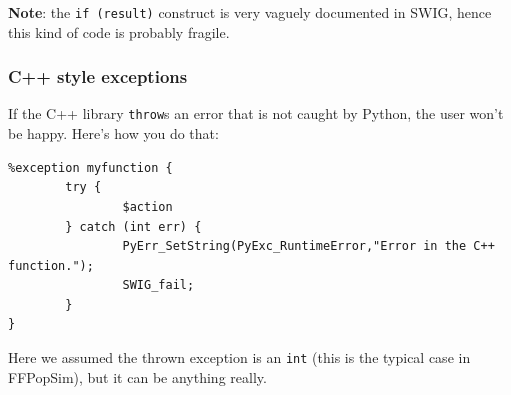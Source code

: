 \documentclass[12pt,a4paper,notitlepage,onecolumn]{article}
\begin{document}
\noindent\textbf{Note}: the \texttt{if (result)} construct is very vaguely documented in
SWIG, hence this kind of code is probably fragile.

\subsubsection*{C++ style exceptions}
If the C++ library \texttt{throw}s an error that is not caught by Python, the
user won't be happy. Here's how you do that:
\begin{verbatim}
%exception myfunction {
        try {
                $action
        } catch (int err) {
                PyErr_SetString(PyExc_RuntimeError,"Error in the C++ function.");
                SWIG_fail;
        }
}
\end{verbatim}
Here we assumed the thrown exception is an \texttt{int} (this is the typical
case in FFPopSim), but it can be anything really.



%
%
\end{document}
